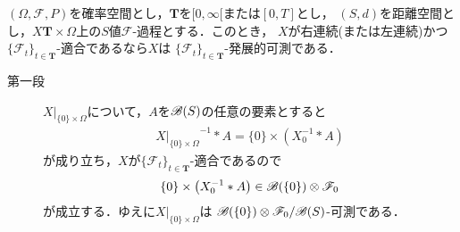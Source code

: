 	\begin{screen}
		\begin{thm}[右連続または左連続な適合過程は発展的可測]
			$(\Omega,\mathscr{F},P)$を確率空間とし，$\mathbf{T}$を$[0,\infty[$または$[0,T]$とし，
			$(S,d)$を距離空間とし，$X$$\mathbf{T} \times \Omega$上の$S$値$\mathscr{F}$-過程とする．このとき，
			$X$が右連続(または左連続)かつ$\{\mathscr{F}_t\}_{t \in \mathbf{T}}$-適合であるなら$X$は
			$\{\mathscr{F}_t\}_{t \in \mathbf{T}}$-発展的可測である．
		\end{thm}
	\end{screen}
	
	\begin{sketch}\mbox{}
		\begin{description}
			\item[第一段] $X|_{\{0\} \times \Omega}$について，$A$を$\mathscr{B}(S)$の任意の要素とすると
				\begin{align}
					{X|_{\{0\} \times \Omega}}^{-1} \ast A
					= \{0\} \times \left( X_0^{-1} \ast A \right)
				\end{align}
				が成り立ち，$X$が$\{\mathscr{F}_t\}_{t \in \mathbf{T}}$-適合であるので
				\begin{align}
					\{0\} \times \left( X_0^{-1} \ast A \right) \in \mathscr{B}(\{0\}) \otimes \mathscr{F}_0
				\end{align}
				が成立する．ゆえに$X|_{\{0\} \times \Omega}$は
				$\mathscr{B}(\{0\}) \otimes \mathscr{F}_0/\mathscr{B}(S)$-可測である．
				

\end{description}
\end{sketch}
